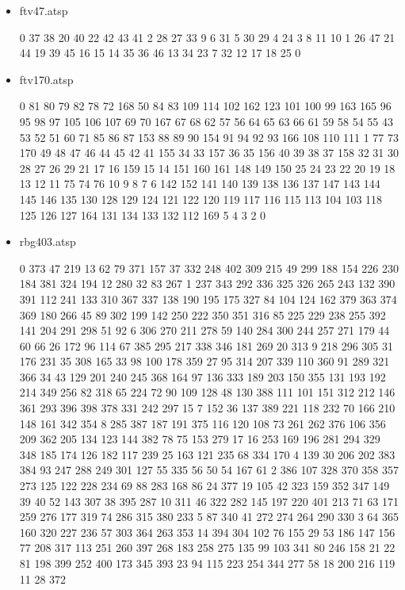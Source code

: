 \documentclass[a4paper]{article}
\begin{document}
\begin{itemize}
      \item ftv47.atsp

            0 37 38 20 40 22 42 43 41 2 28 27 33 9 6 31 5 30 29 4 24 3 8 11 10 1
            26 47 21 44 19 39 45 16 15 14 35 36 46 13 34 23 7 32 12 17 18 25 0

      \item ftv170.atsp

            0 81 80 79 82 78 72 168 50 84 83 109 114 102 162 123 101 100 99 163
            165 96 95 98 97 105 106 107 69 70 167 67 68 62 57 56 64 65 63 66 61
            59 58 54 55 43 53 52 51 60 71 85 86 87 153 88 89 90 154 91 94 92 93
            166 108 110 111 1 77 73 170 49 48 47 46 44 45 42 41 155 34 33 157 36
            35 156 40 39 38 37 158 32 31 30 28 27 26 29 21 17 16 159 15 14 151
            160 161 148 149 150 25 24 23 22 20 19 18 13 12 11 75 74 76 10 9 8 7
            6 142 152 141 140 139 138 136 137 147 143 144 145 146 135 130 128
            129 124 121 122 120 119 117 116 115 113 104 103 118 125 126 127 164
            131 134 133 132 112 169 5 4 3 2 0

      \item rbg403.atsp

            0 373 47 219 13 62 79 371 157 37 332 248 402 309 215 49 299 188 154
            226 230 184 381 324 194 12 280 32 83 267 1 237 343 292 336 325 326
            265 243 132 390 391 112 241 133 310 367 337 138 190 195 175 327 84
            104 124 162 379 363 374 369 180 266 45 89 302 199 142 250 222 350
            351 316 85 225 229 238 255 392 141 204 291 298 51 92 6 306 270 211
            278 59 140 284 300 244 257 271 179 44 60 66 26 172 96 114 67 385 295
            217 338 346 181 269 20 313 9 218 296 305 31 176 231 35 308 165 33 98
            100 178 359 27 95 314 207 339 110 360 91 289 321 366 34 43 129 201
            240 245 368 164 97 136 333 189 203 150 355 131 193 192 214 349 256
            82 318 65 224 72 90 109 128 48 130 388 111 101 151 312 212 146 361
            293 396 398 378 331 242 297 15 7 152 36 137 389 221 118 232 70 166
            210 148 161 342 354 8 285 387 187 191 375 116 120 108 73 261 262 376
            106 356 209 362 205 134 123 144 382 78 75 153 279 17 16 253 169 196
            281 294 329 348 185 174 126 182 117 239 25 163 121 235 68 334 170 4
            139 30 206 202 383 384 93 247 288 249 301 127 55 335 56 50 54 167 61
            2 386 107 328 370 358 357 273 125 122 228 234 69 88 283 168 86 24
            377 19 105 42 323 159 352 347 149 39 40 52 143 307 38 395 287 10 311
            46 322 282 145 197 220 401 213 71 63 171 259 276 177 319 74 286 315
            380 233 5 87 340 41 272 274 264 290 330 3 64 365 160 320 227 236 57
            303 364 263 353 14 394 304 102 76 155 29 53 186 147 156 77 208 317
            113 251 260 397 268 183 258 275 135 99 103 341 80 246 158 21 22 81
            198 399 252 400 173 345 393 23 94 115 223 254 344 277 58 18 200 216
            119 11 28 372
\end{itemize}
\end{document}
